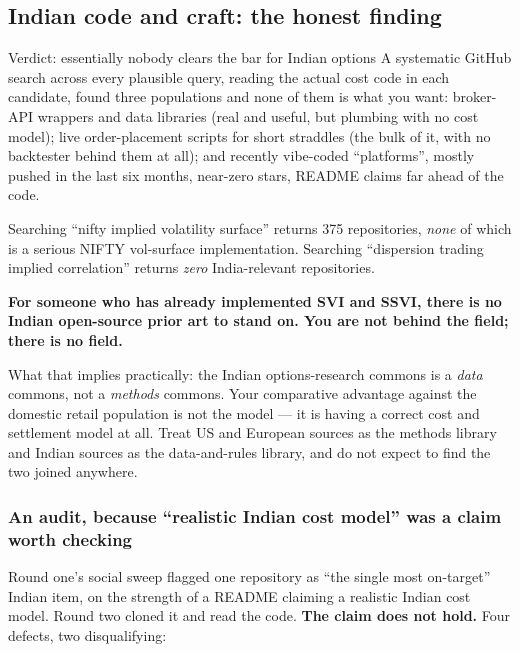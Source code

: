 \documentclass[11pt,a4paper]{article}
\begin{document}
\subsection{Indian code and craft: the honest finding}
\label{sec:indiacode}

\begin{keyfact}{Verdict: essentially nobody clears the bar for Indian options}
A systematic GitHub search across every plausible query, reading the actual cost
code in each candidate, found three populations and none of them is what you want:
broker-API wrappers and data libraries (real and useful, but plumbing with no cost
model); live order-placement scripts for short straddles (the bulk of it, with no
backtester behind them at all); and recently vibe-coded ``platforms'', mostly
pushed in the last six months, near-zero stars, README claims far ahead of the code.

Searching ``nifty implied volatility surface'' returns 375 repositories, \emph{none}
of which is a serious NIFTY vol-surface implementation. Searching ``dispersion
trading implied correlation'' returns \emph{zero} India-relevant repositories.

\textbf{For someone who has already implemented SVI and SSVI, there is no Indian
open-source prior art to stand on. You are not behind the field; there is no field.}
\end{keyfact}

What that implies practically: the Indian options-research commons is a
\emph{data} commons, not a \emph{methods} commons. Your comparative advantage
against the domestic retail population is not the model --- it is having a correct
cost and settlement model at all. Treat US and European sources as the methods
library and Indian sources as the data-and-rules library, and do not expect to find
the two joined anywhere.

\subsubsection{An audit, because ``realistic Indian cost model'' was a claim worth checking}

Round one's social sweep flagged one repository as ``the single most on-target''
Indian item, on the strength of a README claiming a realistic Indian cost model.
Round two cloned it and read the code. \textbf{The claim does not hold.} Four
defects, two disqualifying:
\end{document}
